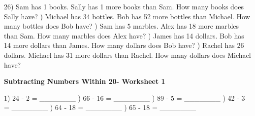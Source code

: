 \documentclass{article}%
\begin{document}
26) Sam has 1 books. Sally has 1 more books than Sam. How many books does Sally have?%
\newline%
\newline%
) Michael has 34 bottles. Bob has 52 more bottles than Michael. How many bottles does Bob have?%
\newline%
\newline%
) Sam has 5 marbles. Alex has 18 more marbles than Sam. How many marbles does Alex have?%
\newline%
\newline%
) James has 14 dollars. Bob has 14 more dollars than James. How many dollars does Bob have?%
\newline%
\newline%
) Rachel has 26 dollars. Michael has 31 more dollars than Rachel. How many dollars does Michael have?%
\newline%
\newline%
\newline%
\pagebreak%
\large%
\begin{center}%
\textbf{Subtracting Numbers Within 20- Worksheet 1}%
\newline%
\newline%
\newline%
\end{center} \normalsize%
1) 24 {-} 2 = \_\_\_\_\_\_\_%
\newline%
\newline%
) 66 {-} 16 = \_\_\_\_\_\_\_%
\newline%
\newline%
) 89 {-} 5 = \_\_\_\_\_\_\_%
\newline%
\newline%
) 42 {-} 3 = \_\_\_\_\_\_\_%
\newline%
\newline%
) 64 {-} 18 = \_\_\_\_\_\_\_%
\newline%
\newline%
) 65 {-} 18 = \_\_\_\_\_\_\_%
\newline%
\newline%
\end{document}
